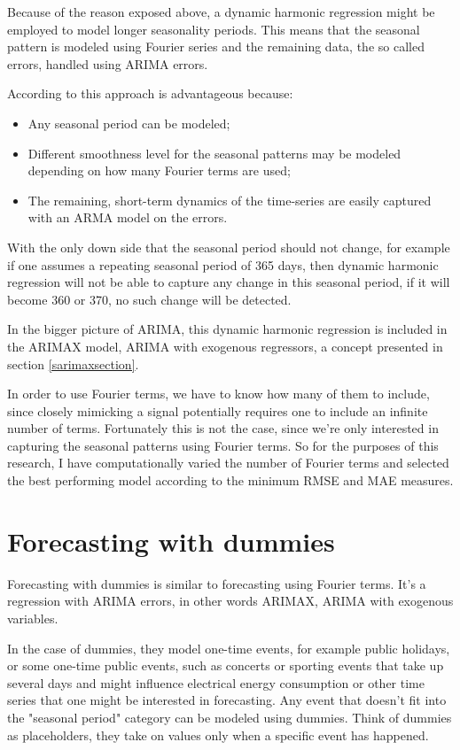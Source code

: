 \documentclass[12pt,a4paper,titlepage]{report}
\begin{document}
Because of the reason exposed above, a dynamic harmonic regression might be employed to model longer seasonality periods. This means that the seasonal pattern is modeled using Fourier series and the remaining data, the so called errors, handled using ARIMA errors.

According to \cite{fpp2dhr} this approach is advantageous because:
\begin{itemize}
    \item Any seasonal period can be modeled;
    \item Different smoothness level for the seasonal patterns may be modeled depending on how many Fourier terms are used;
    \item The remaining, short-term dynamics of the time-series are easily captured with an ARMA model on the errors.
\end{itemize}

With the only down side that the seasonal period should not change, for example if one assumes a repeating seasonal period of 365 days, then dynamic harmonic regression will not be able to capture any change in this seasonal period, if it will become 360 or 370, no such change will be detected.

In the bigger picture of ARIMA, this dynamic harmonic regression is included in the ARIMAX model, ARIMA with exogenous regressors, a concept presented in section \ref{sarimaxsection}.

In order to use Fourier terms, we have to know how many of them to include, since closely mimicking a signal potentially requires one to include an infinite number of terms. Fortunately this is not the case, since we're only interested in capturing the seasonal patterns using Fourier terms. So for the purposes of this research, I have computationally varied the number of Fourier terms and selected the best performing model according to the minimum RMSE and MAE measures.

\section{Forecasting with dummies}

Forecasting with dummies is similar to forecasting using Fourier terms. It's a regression with ARIMA errors, in other words ARIMAX, ARIMA with exogenous variables.

In the case of dummies, they model one-time events, for example public holidays, or some one-time public events, such as concerts or sporting events that take up several days and might influence electrical energy consumption or other time series that one might be interested in forecasting. Any event that doesn't fit into the "seasonal period" category can be modeled using dummies. Think of dummies as placeholders, they take on values only when a specific event has happened.
\end{document}
